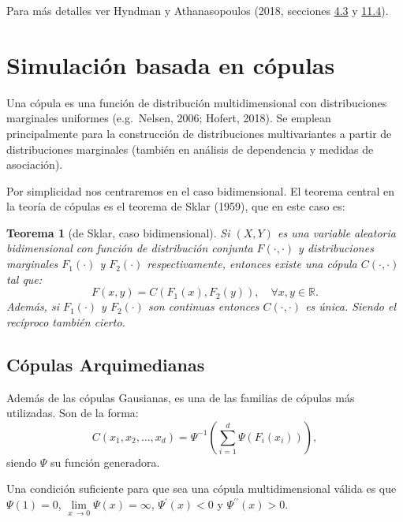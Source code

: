 \documentclass[
]{book}
\theoremstyle{break}
\newtheorem{theorem}{Teorema}[chapter]
\theoremstyle{definition}
\theoremstyle{definition}
\theoremstyle{definition}
\theoremstyle{definition}
\theoremstyle{remark}
\begin{document}
Para más detalles ver Hyndman y Athanasopoulos (2018, secciones \href{https://otexts.com/fpp2/prediction-intervals.html}{4.3} y \href{https://otexts.com/fpp2/bootstrap.html}{11.4}).

\hypertarget{simulaciuxf3n-basada-en-cuxf3pulas}{%
\section{Simulación basada en cópulas}\label{simulaciuxf3n-basada-en-cuxf3pulas}}

Una cópula es una función de distribución multidimensional con distribuciones marginales uniformes (e.g.~Nelsen, 2006; Hofert, 2018).
Se emplean principalmente para la construcción de distribuciones multivariantes a partir de distribuciones marginales (también en análisis de dependencia y medidas de asociación).

Por simplicidad nos centraremos en el caso bidimensional.
El teorema central en la teoría de cópulas es el teorema de Sklar (1959), que en este caso es:

\begin{theorem}[de Sklar, caso bidimensional]
\protect\hypertarget{thm:sklar}{}{\label{thm:sklar} {} }
Si \((X,Y)\) es una variable aleatoria bidimensional con función de distribución conjunta \(F(\cdot,\cdot)\) y distribuciones marginales \(F_1(\cdot)\) y \(F_2(\cdot)\) respectivamente, entonces existe una cópula \(C(\cdot,\cdot)\) tal que:
\[F(x,y)=C\left( F_1(x),F_2(y)\right) ,\quad \forall x,y\in\mathbb{R}.\]
Además, si \(F_1(\cdot)\) y \(F_2(\cdot)\) son continuas entonces \(C(\cdot,\cdot)\) es única.
Siendo el recíproco también cierto.
\end{theorem}

\hypertarget{cuxf3pulas-arquimedianas}{%
\subsection{Cópulas Arquimedianas}\label{cuxf3pulas-arquimedianas}}

Además de las cópulas Gausianas, es una de las familias de cópulas más utilizadas.
Son de la forma:
\[C(x_1,x_2,\dots,x_d)
=\Psi^{-1}\left( \sum_{i=1}^d\Psi\left( F_i(x_i)\right)\right),\]
siendo \(\Psi\) su función generadora.

Una condición suficiente para que sea una cópula multidimensional válida es que \(\Psi(1)=0\), \(\lim \limits_{x\ \rightarrow0}\Psi(x)=\infty\), \(\Psi^{\prime}(x)<0\) y \(\Psi^{\prime \prime}(x)>0\).
\end{document}
